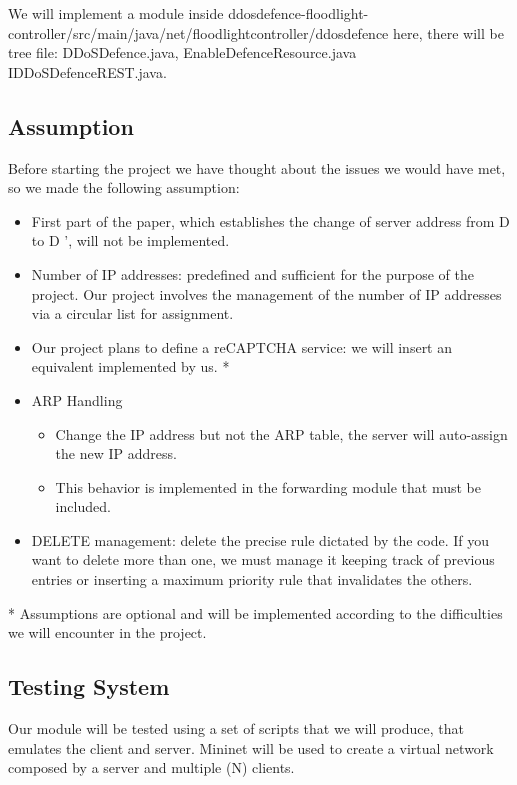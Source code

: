 We will implement a module inside ddosdefence-floodlight-controller/src/main/java/net/floodlightcontroller/ddosdefence here, there will be tree file: DDoSDefence.java, EnableDefenceResource.java IDDoSDefenceREST.java.

\subsection{Assumption}
Before starting the project we have thought about the issues we would have met, so we made the following assumption:
\begin{itemize}
	\item First part of the paper, which establishes the change of server address from D to D ', will not be implemented.
	\item Number of IP addresses: predefined and sufficient for the purpose of the project. Our project involves the management of the number of IP addresses via a circular list for assignment. 
	\item Our project plans to define a reCAPTCHA service: we will insert an equivalent implemented by us. *
	\item ARP Handling 
		\begin{itemize}
			\item Change the IP address but not the ARP table, the server will auto-assign the new IP address.
			\item This behavior is implemented in the forwarding module that must be included.
		\end{itemize}
	\item DELETE management: delete the precise rule dictated by the code. If you want to delete more than one, we must manage it keeping track of previous entries or inserting a maximum priority rule that invalidates the others.
\end{itemize}
* Assumptions are optional and will be implemented according to the difficulties we will encounter in the project.

\subsection{Testing System}
Our module will be tested using a set of scripts that we will produce, that emulates the client and server. Mininet will be used to create a virtual network composed  by a server and multiple (N) clients.

